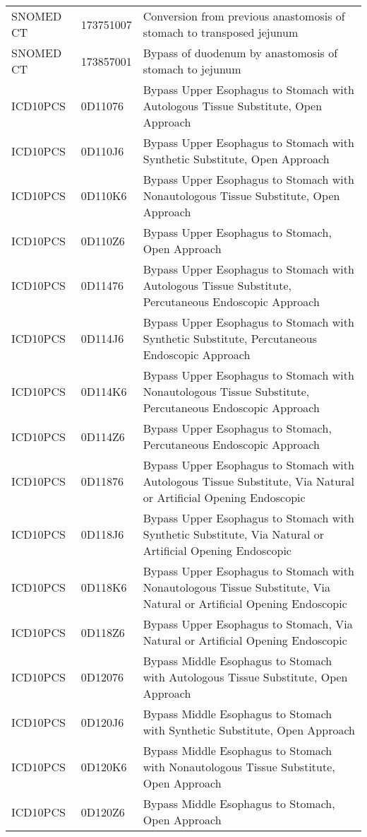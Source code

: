 \begin{longtable}{p{}p{}p{}}
  SNOMED CT & 173751007 & Conversion from previous anastomosis of stomach to transposed jejunum \\ 
  SNOMED CT & 173857001 & Bypass of duodenum by anastomosis of stomach to jejunum \\ 
  ICD10PCS & 0D11076 & Bypass Upper Esophagus to Stomach with Autologous Tissue Substitute, Open Approach \\ 
  ICD10PCS & 0D110J6 & Bypass Upper Esophagus to Stomach with Synthetic Substitute, Open Approach \\ 
  ICD10PCS & 0D110K6 & Bypass Upper Esophagus to Stomach with Nonautologous Tissue Substitute, Open Approach \\ 
  ICD10PCS & 0D110Z6 & Bypass Upper Esophagus to Stomach, Open Approach \\ 
  ICD10PCS & 0D11476 & Bypass Upper Esophagus to Stomach with Autologous Tissue Substitute, Percutaneous Endoscopic Approach \\ 
  ICD10PCS & 0D114J6 & Bypass Upper Esophagus to Stomach with Synthetic Substitute, Percutaneous Endoscopic Approach \\ 
  ICD10PCS & 0D114K6 & Bypass Upper Esophagus to Stomach with Nonautologous Tissue Substitute, Percutaneous Endoscopic Approach \\ 
  ICD10PCS & 0D114Z6 & Bypass Upper Esophagus to Stomach, Percutaneous Endoscopic Approach \\ 
  ICD10PCS & 0D11876 & Bypass Upper Esophagus to Stomach with Autologous Tissue Substitute, Via Natural or Artificial Opening Endoscopic \\ 
  ICD10PCS & 0D118J6 & Bypass Upper Esophagus to Stomach with Synthetic Substitute, Via Natural or Artificial Opening Endoscopic \\ 
  ICD10PCS & 0D118K6 & Bypass Upper Esophagus to Stomach with Nonautologous Tissue Substitute, Via Natural or Artificial Opening Endoscopic \\ 
  ICD10PCS & 0D118Z6 & Bypass Upper Esophagus to Stomach, Via Natural or Artificial Opening Endoscopic \\ 
  ICD10PCS & 0D12076 & Bypass Middle Esophagus to Stomach with Autologous Tissue Substitute, Open Approach \\ 
  ICD10PCS & 0D120J6 & Bypass Middle Esophagus to Stomach with Synthetic Substitute, Open Approach \\ 
  ICD10PCS & 0D120K6 & Bypass Middle Esophagus to Stomach with Nonautologous Tissue Substitute, Open Approach \\ 
  ICD10PCS & 0D120Z6 & Bypass Middle Esophagus to Stomach, Open Approach \\ 

\end{longtable}
